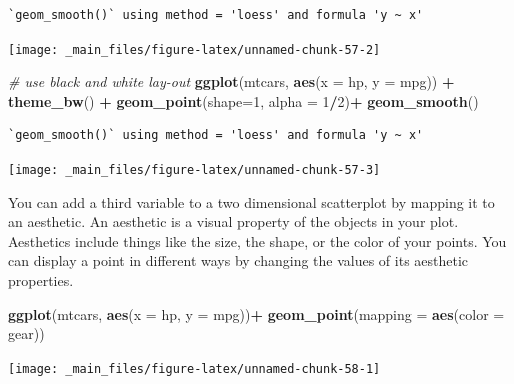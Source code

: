 \documentclass[
]{book}
\newenvironment{Shaded}{\begin{snugshade}}{\end{snugshade}}
\newcommand{\CommentTok}[1]{\textcolor[rgb]{0.56,0.35,0.01}{\textit{#1}}}
\newcommand{\DataTypeTok}[1]{\textcolor[rgb]{0.13,0.29,0.53}{#1}}
\newcommand{\DecValTok}[1]{\textcolor[rgb]{0.00,0.00,0.81}{#1}}
\newcommand{\KeywordTok}[1]{\textcolor[rgb]{0.13,0.29,0.53}{\textbf{#1}}}
\newcommand{\NormalTok}[1]{#1}
\newcommand{\OperatorTok}[1]{\textcolor[rgb]{0.81,0.36,0.00}{\textbf{#1}}}
\newcommand{\StringTok}[1]{\textcolor[rgb]{0.31,0.60,0.02}{#1}}
\begin{document}
\begin{verbatim}
`geom_smooth()` using method = 'loess' and formula 'y ~ x'
\end{verbatim}

\begin{center}\texttt{[image: \_main\_files/figure-latex/unnamed-chunk-57-2]} \end{center}

\begin{Shaded}
\begin{Highlighting}[]
\CommentTok{# use black and white lay-out}
\KeywordTok{ggplot}\NormalTok{(mtcars, }\KeywordTok{aes}\NormalTok{(}\DataTypeTok{x =}\NormalTok{ hp, }\DataTypeTok{y =}\NormalTok{ mpg)) }\OperatorTok{+}\StringTok{ }\KeywordTok{theme_bw}\NormalTok{() }\OperatorTok{+}
\StringTok{  }\KeywordTok{geom_point}\NormalTok{(}\DataTypeTok{shape=}\DecValTok{1}\NormalTok{, }\DataTypeTok{alpha =} \DecValTok{1}\OperatorTok{/}\DecValTok{2}\NormalTok{)}\OperatorTok{+}\StringTok{ }
\StringTok{  }\KeywordTok{geom_smooth}\NormalTok{() }
\end{Highlighting}
\end{Shaded}

\begin{verbatim}
`geom_smooth()` using method = 'loess' and formula 'y ~ x'
\end{verbatim}

\begin{center}\texttt{[image: \_main\_files/figure-latex/unnamed-chunk-57-3]} \end{center}

You can add a third variable to a two dimensional scatterplot by mapping it to an aesthetic. An aesthetic is a visual property of the objects in your plot. Aesthetics include things like the size, the shape, or the color of your points. You can display a point in different ways by changing the values of its aesthetic properties.

\begin{Shaded}
\begin{Highlighting}[]
\KeywordTok{ggplot}\NormalTok{(mtcars, }\KeywordTok{aes}\NormalTok{(}\DataTypeTok{x =}\NormalTok{ hp, }\DataTypeTok{y =}\NormalTok{ mpg))}\OperatorTok{+}
\StringTok{  }\KeywordTok{geom_point}\NormalTok{(}\DataTypeTok{mapping =} \KeywordTok{aes}\NormalTok{(}\DataTypeTok{color =}\NormalTok{ gear))}
\end{Highlighting}
\end{Shaded}

\begin{center}\texttt{[image: \_main\_files/figure-latex/unnamed-chunk-58-1]} \end{center}
\end{document}
